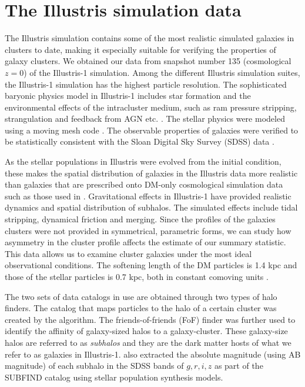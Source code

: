 \section{The Illustris simulation data} 
\label{sec:illustris_sim}
The Illustris simulation contains some of the most
realistic simulated galaxies in clusters to date, making it especially suitable for 
verifying the properties of galaxy clusters. We obtained our data from 
snapshot number 135 (cosmological $z=0$) of the Illustris-1 simulation. 
Among the different Illustris simulation suites,
the Illustris-1 simulation has the highest particle resolution. 
The sophisticated baryonic physics model in Illustris-1 
includes star formation and the environmental effects of the intracluster medium, 
such as ram pressure stripping,
strangulation and feedback from AGN etc. \citep{Genel2014a}.
The stellar physics were modeled using a moving mesh code {} \citep{Springel2010}.
The observable properties of galaxies were verified to be statistically consistent
with the Sloan Digital Sky Survey (SDSS) data \citep{Vogelsberger2014}. 

As the stellar populations in Illustris were evolved from the initial condition,
these makes the spatial distribution of galaxies in the Illustris data more 
realistic than galaxies that are prescribed onto DM-only cosmological
simulation data such as those used in \cite{Harvey2013d}.  
Gravitational effects in Illustris-1 have provided realistic dynamics and
spatial distribution of subhalos. The simulated effects include
tidal stripping, dynamical friction and merging. 
Since the profiles of the galaxies clusters were not
provided in symmetrical, parametric forms, we can study 
how asymmetry in the cluster profile affects the estimate of our summary 
statistic. This data allows us to examine cluster galaxies
under the most ideal observational conditions. 
The softening length of the DM particles is
1.4 kpc and those of the stellar particles is 
0.7 kpc, both in constant comoving units \citep{Genel2014a}.

The two sets of data catalogs in use are obtained through two types of halo
finders. The catalog that maps particles to the halo of a certain cluster was 
created by the {} algorithm. The friends-of-friends (FoF) 
finder \citep{Davis1985} was further used to identify the affinity
of galaxy-sized halos to a galaxy-cluster. 
These galaxy-size halos are referred to as {\it subhalos} and 
they are the dark matter hosts of what we refer to as galaxies in Illustris-1. 
\cite{Vogelsberger2014a} also extracted the 
absolute magnitude (using AB magnitude) of each subhalo in
the SDSS bands of $g, r, i, z$ as part of the {\sc
SUBFIND} catalog using stellar population synthesis models.

